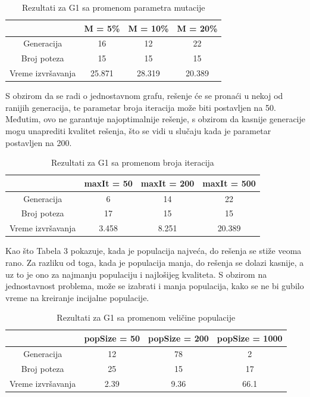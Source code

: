 \documentclass[12pt]{article}
\begin{document}
	\begin {table}[H]
	\begin{center}
	\caption {Rezultati za G1 sa promenom parametra mutacije} \label{tab:title} 
	\begin{tabular}{|| c|c c c||} 	
		\hline
		& M = 5\% & M = 10\% & M = 20\% \\ 
		\hline\hline
		Generacija & 16 & 12 & 22  \\ 
		\hline
		Broj poteza & 15 & 15 & 15 \\
		\hline
		Vreme izvršavanja & 25.871 & 28.319 & 20.389 \\
		\hline
	\end{tabular}
	\end{center}
	\end{table}
	\par
	\par S obzirom da se radi o jednostavnom grafu, rešenje će se pronaći u nekoj od ranijih generacija, te parametar broja iteracija može biti postavljen na 50. Međutim, ovo ne garantuje najoptimalnije rešenje, s obzirom da kasnije generacije mogu unaprediti kvalitet rešenja, što se vidi u slučaju kada je parametar postavljen na 200. 
		\begin {table}[H]
	\begin{center}
		\caption {Rezultati za G1 sa promenom broja iteracija} \label{tab:title} 
		\begin{tabular}{|| c|c c c||} 	
			\hline
			& maxIt = 50 & maxIt = 200 & maxIt = 500 \\ 
			\hline\hline
			Generacija & 6 & 14 & 22  \\ 
			\hline
			Broj poteza & 17 & 15 & 15 \\
			\hline
			Vreme izvršavanja & 3.458 & 8.251 & 20.389 \\
			\hline
		\end{tabular}
	\end{center}
\end{table}
	\par
	\par Kao što Tabela 3 pokazuje, kada je populacija najveća, do rešenja se stiže veoma rano. Za razliku od toga, kada je populacija manja, do rešenja se dolazi kasnije, a uz to je ono za najmanju populaciju i najlošijeg kvaliteta. S obzirom na jednostavnost problema, može se izabrati i manja populacija, kako se ne bi gubilo vreme na kreiranje incijalne populacije.
	\begin {table}[H]
	\begin{center}
		\caption {Rezultati za G1 sa promenom veličine populacije} \label{tab:title} 
		\begin{tabular}{|| c|c c c||} 	
			\hline
			& popSize = 50 & popSize = 200 & popSize = 1000 \\ 
			\hline\hline
			Generacija & 12 & 78 & 2 \\ 
			\hline
			Broj poteza & 25 & 15 & 17 \\
			\hline
			Vreme izvršavanja & 2.39 & 9.36 & 66.1 \\
			\hline
		\end{tabular}
	\end{center}
\end{table}
	
\end{document}

